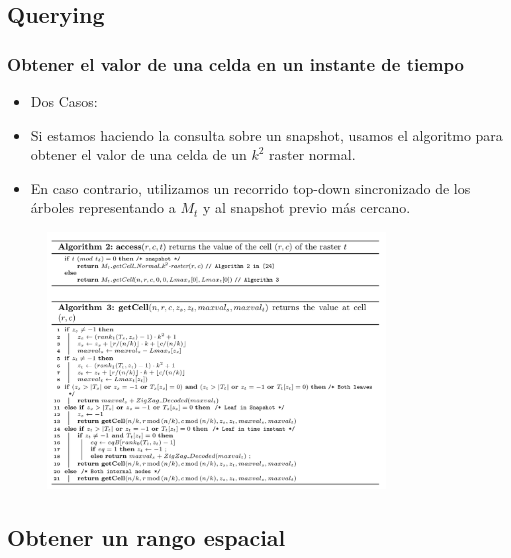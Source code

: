 \documentclass{article}
\begin{document}
\subsection*{Querying}
\subsubsection*{Obtener el valor de una celda en un instante de tiempo}
\begin{itemize}
  \item Dos Casos:
    \item Si estamos haciendo la consulta sobre un snapshot, usamos el algoritmo
      para obtener el valor de una celda de un $k^2$ raster normal.
    \item En caso contrario, utilizamos un recorrido top-down sincronizado
      de los árboles representando a $M_t$ y al snapshot previo más cercano.
\end{itemize}
\begin{figure}[h]
  \centering
  \includegraphics[width=0.8\textwidth]{../images/al2.png}
\end{figure}

\clearpage
\subsection*{Obtener un rango espacial}
\end{document}
